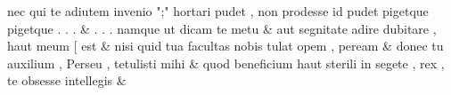 \documentclass[12pt,onecolumn,twoside,a4paper]{memoir}
\begin{document}
\begin{pairs}
\begin{Leftside}
                              nec
                              qui
                              te
                              adiutem
                              invenio
                              ";"
                              hortari
                              pudet
                              ,
                              non
                              prodesse
                              id
                              pudet
                              pigetque
                              {pigetque}
                              .
                              .
                              . \&
                         \stanza {}.
                              .
                              .
                              namque
                              ut
                              dicam
                              te
                              metu & 
                     aut
                              segnitate
                              adire
                              dubitare
                              ,
                              haut
                              meum
                              [
                              est \&
                         \stanza {}
                     nisi
                              quid
                              tua
                              facultas
                              nobis
                              tulat
                              opem
                              ,
                              peream \&
                         \stanza {}
                     donec
                              tu
                              auxilium
                              ,
                              Perseu
                              ,
                              tetulisti
                              mihi \&
                         \stanza {}
                     quod
                              beneficium
                              haut
                              sterili
                              in
                              segete
                              ,
                              rex
                              ,
                              te
                              obsesse
                              intellegis \&
                         \stanza {}
                     

\end{Leftside}
\end{pairs}
\end{document}
